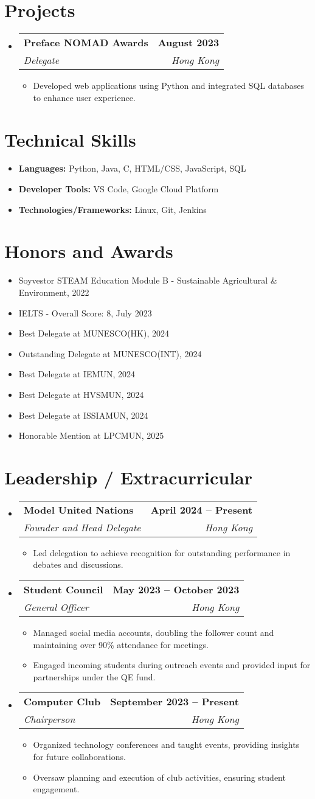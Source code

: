 \documentclass[letterpaper,11pt]{article}
\makeatletter
\newcommand{\resumeItem}[1]{
  \item\small{
    {#1 \vspace{-2pt}}
  }
}
\newcommand{\resumeSubheading}[4]{
  \vspace{-2pt}\item
    \begin{tabular*}{1.0\textwidth}[t]{l@{\extracolsep{\fill}}r}
      \textbf{#1} & \textbf{\small #2} \\
      \textit{\small#3} & \textit{\small #4} \\
    \end{tabular*}\vspace{-7pt}
}
\newcommand{\resumeItemListStart}{\begin{itemize}}
\newcommand{\resumeItemListEnd}{\end{itemize}\vspace{-5pt}}
\makeatother
\begin{document}
\section{Projects}
  \resumeItemListStart
    \resumeSubheading
      {Preface NOMAD Awards}{August 2023}
      {Delegate}{Hong Kong}
      \resumeItemListStart
        \resumeItem{Developed web applications using Python and integrated SQL databases to enhance user experience.}
      \resumeItemListEnd
  \resumeItemListEnd

\section{Technical Skills}
  \resumeItemListStart
    \resumeItem{\textbf{Languages:} Python, Java, C, HTML/CSS, JavaScript, SQL}
    \resumeItem{\textbf{Developer Tools:} VS Code, Google Cloud Platform}
    \resumeItem{\textbf{Technologies/Frameworks:} Linux, Git, Jenkins}
  \resumeItemListEnd

\section{Honors and Awards}
  \resumeItemListStart
    \resumeItem{Soyvestor STEAM Education Module B - Sustainable Agricultural \& Environment, 2022}
    \resumeItem{IELTS - Overall Score: 8, July 2023}
    \resumeItem{Best Delegate at MUNESCO(HK), 2024}
    \resumeItem{Outstanding Delegate at MUNESCO(INT), 2024}
    \resumeItem{Best Delegate at IEMUN, 2024}
    \resumeItem{Best Delegate at HVSMUN, 2024}
    \resumeItem{Best Delegate at ISSIAMUN, 2024}
    \resumeItem{Honorable Mention at LPCMUN, 2025}
  \resumeItemListEnd

\section{Leadership / Extracurricular}
  \resumeItemListStart
    \resumeSubheading
      {Model United Nations}{April 2024 -- Present}
      {Founder and Head Delegate}{Hong Kong}
      \resumeItemListStart
        \resumeItem{Led delegation to achieve recognition for outstanding performance in debates and discussions.}
      \resumeItemListEnd

    \resumeSubheading
      {Student Council}{May 2023 -- October 2023}
      {General Officer}{Hong Kong}
      \resumeItemListStart
        \resumeItem{Managed social media accounts, doubling the follower count and maintaining over 90\% attendance for meetings.}
        \resumeItem{Engaged incoming students during outreach events and provided input for partnerships under the QE fund.}
      \resumeItemListEnd

    \resumeSubheading
      {Computer Club}{September 2023 -- Present}
      {Chairperson}{Hong Kong}
      \resumeItemListStart
        \resumeItem{Organized technology conferences and taught events, providing insights for future collaborations.}
        \resumeItem{Oversaw planning and execution of club activities, ensuring student engagement.}
      \resumeItemListEnd
  \resumeItemListEnd
\end{document}
